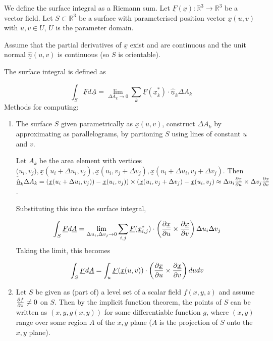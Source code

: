 \begin{definition}
	We define the surface integral as a Riemann sum. Let $\underline{F}(\underline{x}): \mathbb{R}^3 \rightarrow \mathbb{R}^3$ be a vector field. Let $S \subset \mathbb{R}^3$ be a surface with parameterised position vector $\underline{x}(u, v)$ with $u, v \in U$, $U$ is the parameter domain.

	Assume that the partial derivatives of $\underline{x}$ exist and are continuous and the unit normal $\hat{\underline{n}}(u, v)$ is continuous (so $S$ is orientable).

	The surface integral is defined as

	\[ \int_S \underline{F} d\underline{A} = \lim_{\Delta A_k \rightarrow 0} \sum_k \underline{F} (\underline{x}_{k}^*) \cdot \underline{\hat{n}}_k \Delta A_k \]
	Methods for computing:

	\begin{enumerate}
		\item The surface $S$ given parametrically as $\underline{x}(u, v)$, construct $\Delta A_k$ by approximating as parallelograms, by partioning $S$ using lines of constant $u$ and $v$.
		
		Let $A_k$ be the area element with vertices $\underline(u_i, v_j), \underline{x}(u_i + \Delta u_i, v_j), \underline{x}(u_i, v_j + \Delta v_j), \underline{x}(u_i + \Delta u_i, v_j + \Delta v_j)$. Then $\underline{\hat{n}}_k \Delta A_k = (\underline{x}(u_i + \Delta u_i, v_j)) - \underline{x}(u_i, v_j)) \times (\underline{x}(u_i, v_j + \Delta v_j) - \underline{x}(u_i, v_j) \approx \Delta u_i \diffp{\underline{x}}{u} \times \Delta v_j \diffp{\underline{x}}{v}$.

		Substituting this into the surface integral,

		\[ \int_S \underline{F} d\underline{A} = \lim_{\Delta u_i, \Delta v_j \rightarrow 0} \sum_{i, j} \underline{F}(\underline{x}_{i, j}^*) \cdot \left( \diffp{\underline{x}}{u} \times \diffp{\underline{x}}{v} \right) \Delta u_i \Delta v_j \]
		Taking the limit, this becomes

		\[ \int_S \underline{F} d\underline{A} = \int_u \underline{F}(\underline{x}(u, v)) \cdot \left( \diffp{\underline{x}}{u} \times \diffp{\underline{x}}{v} \right) du dv \]

		\item Let $S$ be given as (part of) a level set of a scalar field $f(x, y, z)$ and assume $\diffp{f}{z} \ne 0$ on $S$. Then by the implicit function theorem, the points of $S$ can be written as $(x, y, g(x, y))$ for some differentiable function $g$, where $(x, y)$ range over some region $A$ of the $x, y$ plane ($A$ is the projection of $S$ onto the $x, y$ plane).
		

\end{enumerate}
\end{definition}
